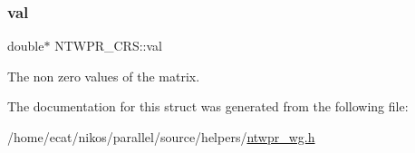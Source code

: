 \subsubsection{\texorpdfstring{val}{val}}
{\footnotesize\ttfamily double$\ast$ N\+T\+W\+P\+R\+\_\+\+C\+R\+S\+::val}

The non zero values of the matrix. 

The documentation for this struct was generated from the following file\+:\begin{DoxyCompactItemize}
\item 
/home/ecat/nikos/parallel/source/helpers/\mbox{\hyperlink{ntwpr__wg_8h}{ntwpr\+\_\+wg.\+h}}\end{DoxyCompactItemize}

